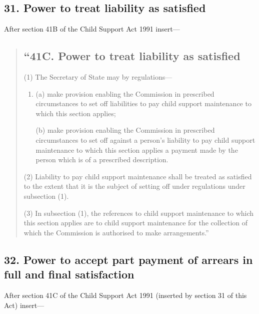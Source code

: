 \documentclass[a4paper]{article}
\begin{document}
\subsection{31. Power to treat liability as satisfied}

After section 41B of the Child Support Act 1991 insert---
\begin{quotation}
\subsection*{``41C. Power to treat liability as satisfied}

(1) The Secretary of State may by regulations---
\begin{enumerate}\item[]
(a) make provision enabling the Commission in prescribed circumstances to set off liabilities to pay child support maintenance to which this section applies;

(b) make provision enabling the Commission in prescribed circumstances to set off against a person’s liability to pay child support maintenance to which this section applies a payment made by the person which is of a prescribed description.
\end{enumerate}

(2)
Liability to pay child support maintenance shall be treated as satisfied to the extent that it is the subject of setting off under regulations under subsection (1).

(3)
In subsection (1), the references to child support maintenance to which this section applies are to child support maintenance for the collection of which the Commission is authorised to make arrangements.''
\end{quotation}

\subsection{32. Power to accept part payment of arrears in full and final satisfaction}

After section 41C of the Child Support Act 1991 (inserted by section 31 of this Act) insert---
\end{document}
